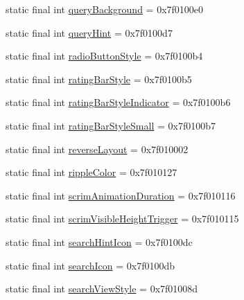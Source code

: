 \begin{CompactItemize}
\item 
static final int \hyperlink{classandroid_1_1support_1_1graphics_1_1drawable_1_1_r_1_1attr_ebee1e9977a985e49015b6b3c6563cd3}{queryBackground} = 0x7f0100e0
\item 
static final int \hyperlink{classandroid_1_1support_1_1graphics_1_1drawable_1_1_r_1_1attr_fb12744f28a16232970346c7352c8e13}{queryHint} = 0x7f0100d7
\item 
static final int \hyperlink{classandroid_1_1support_1_1graphics_1_1drawable_1_1_r_1_1attr_8de71e6cbf9eacd80ef96c4672179564}{radioButtonStyle} = 0x7f0100b4
\item 
static final int \hyperlink{classandroid_1_1support_1_1graphics_1_1drawable_1_1_r_1_1attr_42b78a159d8911061f0d5c1e548bb9ff}{ratingBarStyle} = 0x7f0100b5
\item 
static final int \hyperlink{classandroid_1_1support_1_1graphics_1_1drawable_1_1_r_1_1attr_d3a5c709753288f24348f374db064603}{ratingBarStyleIndicator} = 0x7f0100b6
\item 
static final int \hyperlink{classandroid_1_1support_1_1graphics_1_1drawable_1_1_r_1_1attr_17c11af31741c238e16766b1d39b89d5}{ratingBarStyleSmall} = 0x7f0100b7
\item 
static final int \hyperlink{classandroid_1_1support_1_1graphics_1_1drawable_1_1_r_1_1attr_fafc285bbe92df1b56151769e2fd6c88}{reverseLayout} = 0x7f010002
\item 
static final int \hyperlink{classandroid_1_1support_1_1graphics_1_1drawable_1_1_r_1_1attr_89c88fb650ea7c2f1bd548af1a13b13d}{rippleColor} = 0x7f010127
\item 
static final int \hyperlink{classandroid_1_1support_1_1graphics_1_1drawable_1_1_r_1_1attr_d4b69ed7c88aacd7659e7c74b0439c9e}{scrimAnimationDuration} = 0x7f010116
\item 
static final int \hyperlink{classandroid_1_1support_1_1graphics_1_1drawable_1_1_r_1_1attr_4d435e4210ccc1182f1a00ff1b7ac2c0}{scrimVisibleHeightTrigger} = 0x7f010115
\item 
static final int \hyperlink{classandroid_1_1support_1_1graphics_1_1drawable_1_1_r_1_1attr_19799adab78d09f4b40782bb8613b1b5}{searchHintIcon} = 0x7f0100dc
\item 
static final int \hyperlink{classandroid_1_1support_1_1graphics_1_1drawable_1_1_r_1_1attr_378ec4d1e058befd29e9da0921d9f8d6}{searchIcon} = 0x7f0100db
\item 
static final int \hyperlink{classandroid_1_1support_1_1graphics_1_1drawable_1_1_r_1_1attr_c99c507399e9cb6fc75fe8905a91e717}{searchViewStyle} = 0x7f01008d

\end{CompactItemize}
